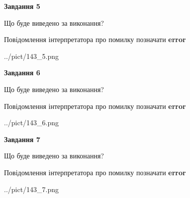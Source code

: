 \documentclass[10pt, ukrainian]{article}
\begin{document}
{\begin {large}
{\begin {center}\textbf{Завдання 5}\end {center}}\par
Що буде виведено за виконання? \par
Повідомлення інтерпретатора про помилку позначати \textbf{error}

\begin{center}
	{../pict/143_5.png}
\end{center}
\newpage

{\begin {center}\textbf{Завдання 6}\end {center}}\par
Що буде виведено за виконання? \par
Повідомлення інтерпретатора про помилку позначати \textbf{error}

\begin{center}
	{../pict/143_6.png}
\end{center}
\newpage

{\begin {center}\textbf{Завдання 7}\end {center}}\par
Що буде виведено за виконання? \par
Повідомлення інтерпретатора про помилку позначати \textbf{error}

\begin{center}
	{../pict/143_7.png}
\end{center}
\newpage

\end {large}}
\end{document}
